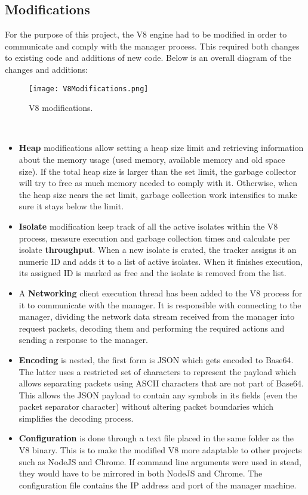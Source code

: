 \documentclass{l4proj}
\begin{document}
\subsection{Modifications}
\hspace*{3em} For the purpose of this project, the V8 engine had to be modified in order to communicate and comply with the manager process. This required both changes to existing code and additions of new code. Below is an overall diagram of the changes and additions:\\
\begin{figure}[!ht]
  \centering
    \texttt{[image: V8Modifications.png]}
	\caption{V8 modifications.}
\end{figure}\\
\begin{itemize}
\item \textbf{Heap} modifications allow setting a heap size limit and retrieving information about the memory usage (used memory, available memory and old space size). If the total heap size is larger than the set limit, the garbage collector will try to free as much memory needed to comply with it. Otherwise, when the heap size nears the set limit, garbage collection work intensifies to make sure it stays below the limit.
\item \textbf{Isolate} modification keep track of all the active isolates within the V8 process, measure execution and garbage collection times and calculate per isolate \textbf{throughput}. When a new isolate is crated, the tracker assigns it an numeric ID and adds it to a list of active isolates. When it finishes execution, its assigned ID is marked as free and the isolate is removed from the list.
\item A \textbf{Networking} client execution thread has been added to the V8 process for it to communicate with the manager. It is responsible with connecting to the manager, dividing the network data stream received from the manager into request packets, decoding them and performing the required actions and sending a response to the manager.
\item \textbf{Encoding} is nested, the first form is JSON which gets encoded to Base64. The latter uses a restricted set of characters to represent the payload which allows separating packets using ASCII characters that are not part of Base64. This allows the JSON payload to contain any symbols in its fields (even the packet separator character) without altering packet boundaries which simplifies the decoding process.
\item \textbf{Configuration} is done through a text file placed in the same folder as the V8 binary. This is to make the modified V8 more adaptable to other projects such as NodeJS and Chrome. If command line arguments were used in stead, they would have to be mirrored in both NodeJS and Chrome. The configuration file contains the IP address and port of the manager machine.
\end{itemize}
\end{document}
